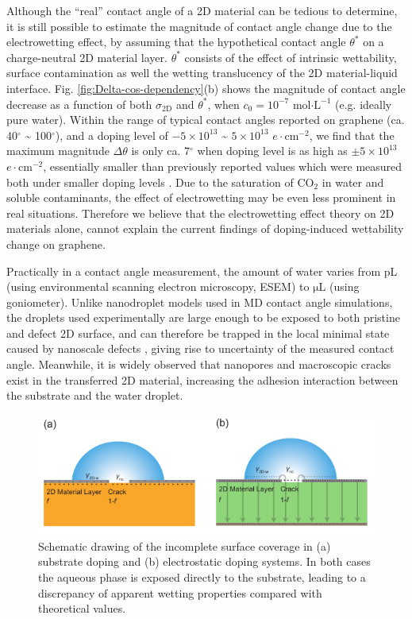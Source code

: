 \documentclass[journal=ancac3,manuscript=article,email=true]{achemso}
\begin{document}
Although the ``real'' contact angle of a 2D material can be tedious to
determine, it is still possible to estimate the magnitude of contact
angle change due to the electrowetting effect, by assuming that the
hypothetical contact angle \(\theta^{*}\) on a charge-neutral 2D
material layer. \(\theta^{*}\) consists of the effect of intrinsic
wettability, surface contamination as well the wetting translucency of
the 2D material-liquid interface. Fig. \ref{fig:Delta-cos-dependency}(b)
shows the magnitude of contact angle decrease as a function of both
\(\sigma_{\mathrm{2D}}\) and \(\theta^{*}\), when \(c_{0}=10^{-7}\)
mol\(\cdot \mathrm{L}^{-1}\) (e.g. ideally pure water). Within the range
of typical contact angles reported on graphene (ca. 40\(^{\circ}\) \textasciitilde{}
100\(^{\circ}\)), and a doping level of \(-5\times10^{13}\) \textasciitilde{}
\(5\times10^{13}\) \(e \cdot \mathrm{cm}^{-2}\), we find that the maximum
magnitude \(\Delta\theta\) is only ca. 7\(^{\circ}\) when doping level is
as high as \(\pm 5 \times 10^{13}\) \(e\cdot \mathrm{cm}^{-2}\),
essentially smaller than previously reported values which were
measured both under smaller doping levels
\cite{hong_mechanism_2016,ashraf_doping-induced_2016}.  Due to the
saturation of CO\(_{\text{2}}\) in water and soluble contaminants, the effect of
electrowetting may be even less prominent in real
situations. Therefore we believe that the electrowetting effect theory
on 2D materials alone, cannot explain the current findings of
doping-induced wettability change on graphene.


Practically in a contact angle measurement, the amount of water varies
from pL (using environmental scanning electron microscopy, ESEM) to
\(\mathrm{\mu L}\) (using goniometer). Unlike nanodroplet models used in
MD contact angle simulations, the droplets used experimentally are
large enough to be exposed to both pristine and defect 2D surface, and
can therefore be trapped in the local minimal state caused by nanoscale
defects \cite{raj_wettability_2013}, giving rise to uncertainty of the
measured contact angle. Meanwhile, it is widely observed that
nanopores and macroscopic cracks exist in the transferred 2D material,
increasing the adhesion interaction between the substrate and the
water droplet.

\begin{figure}[htbp]
\centering
\includegraphics[width=0.95\linewidth]{../img/scheme-crack.pdf}
\caption{\label{fig:scheme-crack}
Schematic drawing of the incomplete surface coverage in (a) substrate doping and (b) electrostatic doping systems. In both cases the aqueous phase is exposed directly to the substrate, leading to a discrepancy of apparent wetting properties compared with theoretical values.}
\end{figure}
\end{document}

